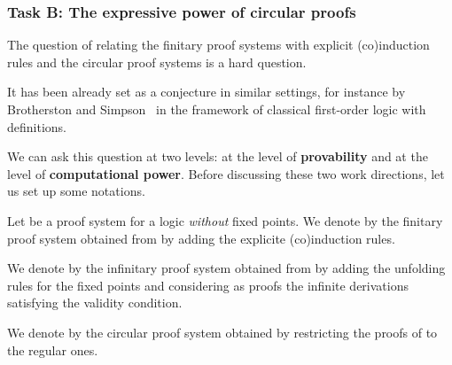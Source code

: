 \subsubsection{Task B: The expressive power of circular proofs}


The question of relating the finitary proof systems with explicit (co)induction rules and the circular proof systems is a hard question.

It has been already set as a conjecture in similar settings, for instance
by Brotherston and Simpson~ in the framework of classical first-order logic with definitions.


We can ask this question at two levels: at the level of \textbf{provability}
and at the level of \textbf{computational power}.  Before discussing these two work directions,
let us set up some notations.

\begin{notation}
  Let \Sys be a proof system for a logic \textit{without} fixed points.
  We denote by \muS the finitary proof system obtained from \Sys by adding
  the explicite (co)induction rules.

  We denote by \muSi the infinitary proof system obtained from \Sys by adding
  the unfolding rules for the fixed points and considering as proofs the
  infinite derivations satisfying the validity condition.

  We denote by \muSo the circular proof system obtained by restricting
  the proofs of \muSi to the regular ones.
\end{notation}

